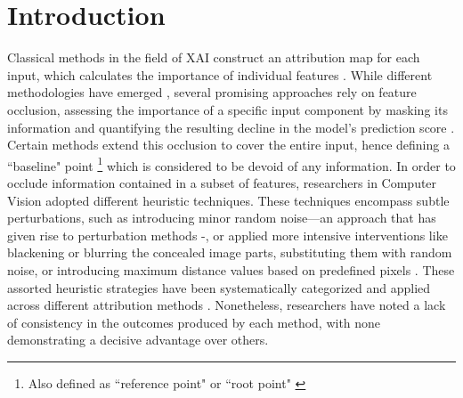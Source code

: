 \section{Introduction}
\label{sec:intro}


Classical methods in the field of XAI construct an attribution map for each input, which calculates the importance of individual features \citep{sundararajan2017axiomatic, selvaraju2017gradcam, Chattopadhay_2018, Wang_2020_CVPR_Workshops, lundberg2017unified, lrp}. While different methodologies have emerged \citep{BARREDOARRIETA202082}, several promising approaches rely on feature occlusion, assessing the importance of a specific input component by masking its information and quantifying the resulting decline in the model's prediction score \citep{9093360, ribeiro2016why, lundberg2017unified, jung2021better, novello2022making, dabkowski2017real}. Certain methods extend this occlusion to cover the entire input, hence defining a ``baseline" point \footnote{Also defined as ``reference point" \citep{shrikumar2017just, shrikumar2019learning}  or ``root point" \citep{MONTAVON2017211}} which is considered to be devoid of any information. In order to occlude information contained in a subset of features, researchers in Computer Vision adopted different heuristic techniques. These techniques encompass subtle perturbations, such as introducing minor random noise—an approach that has given rise to perturbation methods \citep{hsieh2021evaluations}-, or applied more intensive interventions like blackening or blurring the concealed image parts, substituting them with random noise, or introducing maximum distance values based on predefined pixels \citep{haug2021baselines, sturmfels2020visualizing}. These assorted heuristic strategies have been systematically categorized \citep{haug2021baselines} and applied across different attribution methods \citep{sturmfels2020visualizing, kindermans2017unreliability}. Nonetheless, researchers have noted a lack of consistency in the outcomes produced by each method, with none demonstrating a decisive advantage over others. 

